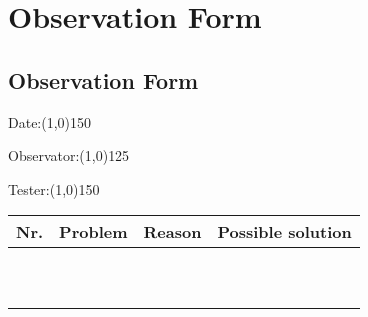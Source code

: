 \chapter{Observation Form}
\label{chap:observationform}
\newpage
\section*{Observation Form}

\indent

Date:\line(1,0){150}
\vspace{5mm}

Observator:\line(1,0){125}
\vspace{5mm}

Tester:\line(1,0){150}
\vspace{5mm}

\begin{table}[h]
	\centering
	\begin{tabular}{| l | p{4cm} | p{4cm} | p{4cm} |}
	\hline
	{\bf Nr.} & {\bf Problem} & {\bf Reason} & {\bf Possible solution} \\ \hline
	& & & \\[1cm] \hline
	& & & \\[1cm] \hline 
	& & & \\[1cm] \hline 
	& & & \\[1cm] \hline 
	& & & \\[1cm] \hline 
	& & & \\[1cm] \hline
	& & & \\[1cm] \hline 
	& & & \\[1cm] \hline 
	& & & \\[1cm] \hline 
	& & & \\[1cm] \hline 
	\end{tabular}
\end{table}